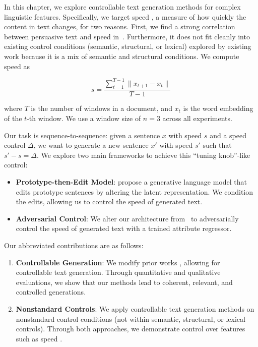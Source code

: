 In this chapter, we explore controllable text generation methods for complex linguistic features. Specifically, we target speed \citep{toubia-2021}, a measure of how quickly the content in text changes, for two reasons. First, we find a strong correlation between persuasive text and speed in~. Furthermore, it does not fit cleanly into existing control conditions (\eg semantic, structural, or lexical) explored by existing work because it is a mix of semantic and structural conditions. We compute speed as 

\begin{equation}
s = \frac{\sum_{t=1}^{T-1} \|x_{t+1} - x_{t}\|}{T-1}    
\end{equation}

where $T$ is the number of windows in a document, and $x_t$ is the word embedding of the $t$-th window. We use a window size of $n = 3$ across all experiments.

Our task is sequence-to-sequence: given a sentence $x$ with speed $s$ and a speed control $\Delta$, we want to generate a new sentence $x'$ with speed $s'$ such that $s' - s = \Delta$. We explore two main frameworks to achieve this ``tuning knob''-like control: 

\begin{itemize}
    \item \textbf{Prototype-then-Edit Model}: \citet{guu2018generating} propose a generative language model that edits prototype sentences by altering the latent representation. We condition the edits, allowing us to control the speed of generated text.
    \item \textbf{Adversarial Control}: We alter our architecture from~ to adversarially control the speed of generated text with a trained attribute regressor.
\end{itemize}

Our abbreviated contributions are as follows: 
\begin{enumerate}
    \item \textbf{Controllable Generation}: We modify prior works \citep{guu2018generating, moorjani-etal-2022-audience}, allowing for controllable text generation. Through quantitative and qualitative evaluations, we show that our methods lead to coherent, relevant, and controlled generations.
    \item \textbf{Nonstandard Controls}: We apply controllable text generation methods on nonstandard control conditions (\ie not within semantic, structural, or lexical controls). Through both approaches, we demonstrate control over features such as speed \citep{toubia-2021}.
\end{enumerate}

